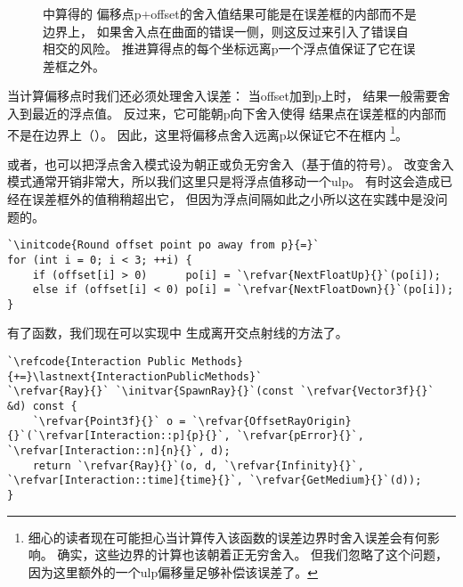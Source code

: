 \begin{figure}[htbp]
    \centering
    \caption{\protect{}中算得的
    偏移点{\ttfamily p+offset}的舍入值结果可能是在误差框的内部而不是边界上，
    如果舍入点在曲面的错误一侧，则这反过来引入了错误自相交的风险。
    推进算得点的每个坐标远离{\ttfamily p}一个浮点值保证了它在误差框之外。}
    \label{fig:3.46}
\end{figure}

当计算偏移点时我们还必须处理舍入误差：
当{\ttfamily offset}加到{\ttfamily p}上时，
结果一般需要舍入到最近的浮点值。
反过来，它可能朝{\ttfamily p}向下舍入使得
结果点在误差框的内部而不是在边界上（）。
因此，这里将偏移点舍入远离{\ttfamily p}以保证它不在框内
\footnote{细心的读者现在可能担心当计算传入该函数的误差边界时舍入误差会有何影响。
    确实，这些边界的计算也该朝着正无穷舍入。
    但我们忽略了这个问题，因为这里额外的一个ulp偏移量足够补偿该误差了。}。

或者，也可以把浮点舍入模式设为朝正或负无穷舍入（基于值的符号）。
改变舍入模式通常开销非常大，所以我们这里只是将浮点值移动一个ulp。
有时这会造成已经在误差框外的值稍稍超出它，
但因为浮点间隔如此之小所以这在实践中是没问题的。
\begin{lstlisting}
`\initcode{Round offset point po away from p}{=}`
for (int i = 0; i < 3; ++i) {
    if (offset[i] > 0)      po[i] = `\refvar{NextFloatUp}{}`(po[i]);
    else if (offset[i] < 0) po[i] = `\refvar{NextFloatDown}{}`(po[i]);
}
\end{lstlisting}

有了函数，我们现在可以实现中
生成离开交点射线的方法了。
\begin{lstlisting}
`\refcode{Interaction Public Methods}{+=}\lastnext{InteractionPublicMethods}` 
`\refvar{Ray}{}` `\initvar{SpawnRay}{}`(const `\refvar{Vector3f}{}` &d) const {
    `\refvar{Point3f}{}` o = `\refvar{OffsetRayOrigin}{}`(`\refvar[Interaction::p]{p}{}`, `\refvar{pError}{}`, `\refvar[Interaction::n]{n}{}`, d);
    return `\refvar{Ray}{}`(o, d, `\refvar{Infinity}{}`, `\refvar[Interaction::time]{time}{}`, `\refvar{GetMedium}{}`(d));
}
\end{lstlisting}

